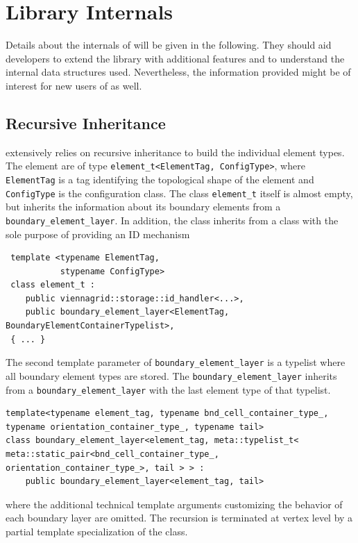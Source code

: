 \chapter{Library Internals} \label{chap:internals}

Details about the internals of {\ViennaGrid} will be given in the following. 
They should aid developers to extend the library with additional features
and to understand the internal data structures used. 
Nevertheless, the information provided might be of interest for new users of {\ViennaGrid} as well.

\section{Recursive Inheritance}
{\ViennaGrid} extensively relies on recursive inheritance to build the individual element types.
The element are of type \lstinline|element_t<ElementTag, ConfigType>|, where \lstinline|ElementTag| is a tag identifying the topological shape of the element and \lstinline|ConfigType| is the configuration class. The class \lstinline|element_t| itself is almost empty, but
inherits the information about its boundary elements from a \lstinline|boundary_element_layer|. 
In addition, the class inherits from a class with the sole purpose of providing an ID mechanism
\begin{lstlisting}
 template <typename ElementTag,
           stypename ConfigType>
 class element_t :
    public viennagrid::storage::id_handler<...>,
    public boundary_element_layer<ElementTag, BoundaryElementContainerTypelist>,
 { ... }
\end{lstlisting}
The second template parameter of \lstinline|boundary_element_layer| is a typelist where all boundary element types are stored. The \lstinline|boundary_element_layer| inherits from a \lstinline|boundary_element_layer| with the last element type of that typelist.
\begin{lstlisting}
template<typename element_tag, typename bnd_cell_container_type_, typename orientation_container_type_, typename tail>
class boundary_element_layer<element_tag, meta::typelist_t< meta::static_pair<bnd_cell_container_type_, orientation_container_type_>, tail > > :
    public boundary_element_layer<element_tag, tail>
\end{lstlisting}
where the additional technical template arguments customizing the behavior of each boundary layer are omitted.
The recursion is terminated at vertex level by a partial template specialization of the class.


